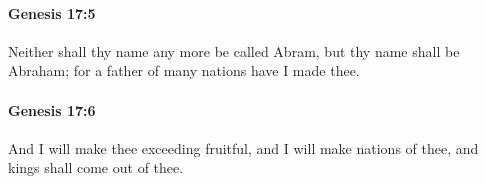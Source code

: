 		\paragraph{Genesis 17:5} %
			\label{GENESIS-17-5}

			Neither shall thy name any more be called Abram, but thy name shall be Abraham; for a father of many nations have I made thee.


		\paragraph{Genesis 17:6} %
			\label{GENESIS-17-6}

			And I will make thee exceeding fruitful, and I will make nations of thee, and kings shall come out of thee.


